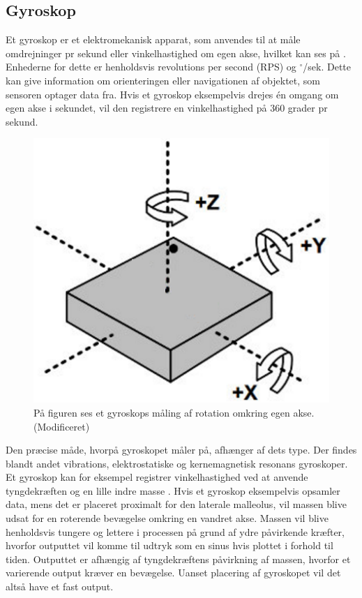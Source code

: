 \subsection{Gyroskop}
Et gyroskop er et elektromekanisk apparat, som anvendes til at måle omdrejninger pr sekund eller vinkelhastighed om egen akse, hvilket kan ses på . Enhederne for dette er henholdsvis revolutions per second (RPS) og $^\circ$/sek. Dette kan give information om orienteringen eller navigationen af objektet, som sensoren optager data fra. Hvis et gyroskop eksempelvis drejes én omgang om egen akse i sekundet, vil den registrere en vinkelhastighed på 360 grader pr sekund. \citep{Sparkfun_gyro}
\begin{figure}[H]
	\centering
	\includegraphics[scale=0.8]{figures/bProblemloesning/gyro.png}
	\caption{På figuren ses et gyroskops måling af rotation omkring egen akse. \citep{Sparkfun_gyro}(Modificeret)}
	\label{fig:gyro}
\end{figure}
Den præcise måde, hvorpå gyroskopet måler på, afhænger af dets type. Der findes blandt andet vibrations, elektrostatiske og kernemagnetisk resonans gyroskoper. \citep{LuingeVeltink2005,TittertonWeston2004} Et gyroskop kan for eksempel registrer vinkelhastighed ved at anvende tyngdekræften og en lille indre masse \citep{Sparkfun_gyro}. Hvis et gyroskop eksempelvis opsamler data, mens det er placeret proximalt for den laterale malleolus, vil massen blive udsat for en roterende bevægelse omkring en vandret akse. Massen vil blive henholdsvis tungere og lettere i processen på grund af ydre påvirkende kræfter, hvorfor outputtet vil komme til udtryk som en sinus hvis plottet i forhold til tiden. Outputtet er afhængig af tyngdekræftens påvirkning af massen, hvorfor et varierende output kræver en bevægelse. Uanset placering af gyroskopet vil det altså have et fast output.\\
